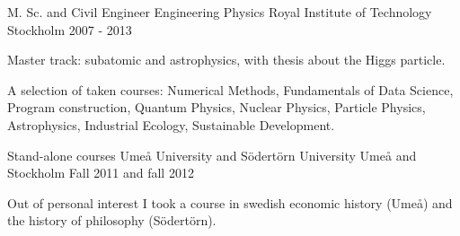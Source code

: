 


\begin{cventries}

\cventry
{M. Sc. and Civil Engineer Engineering Physics} %
{Royal Institute of Technology} %
{Stockholm} %
{2007 - 2013} %
{ %
\begin{cvitems}
\item {Master track: subatomic and astrophysics, with thesis about the Higgs particle.}
\item {A selection of taken courses: Numerical Methods, Fundamentals of Data Science, Program construction, Quantum Physics, Nuclear Physics, Particle Physics, Astrophysics, Industrial Ecology, Sustainable Development.
}
\end{cvitems}
}

\cventry
{Stand-alone courses} %
{Ume{\aa} University and S{\"o}dert{\"o}rn University} %
{Ume{\aa} and Stockholm} %
{Fall 2011 and fall 2012} %
{ %
\begin{cvitems}
\item {Out of personal interest I took a course in swedish economic history (Ume{\aa}) and the history of philosophy (S{\"o}dert{\"o}rn).
}
\end{cvitems}
}

\end{cventries}